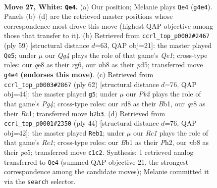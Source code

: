 \documentclass[11pt]{article}
\begin{document}
\clearpage

\begin{figure}[p]\centering
\begin{subfigure}{0.46\textwidth}\centering
\resizebox{\linewidth}{!}{%
\newchessgame
\chessboard[
  setfen={rn1rq1k1/pp3ppp/8/2P1P1B1/6Q1/P5P1/1P3P2/1BR1R1K1 w - - 3 27},
  showmover=false,
  pgfstyle=straightmove, color=movearrow, markmove={g4-e4}
]}
\caption{}
\end{subfigure}\hfill
\begin{subfigure}{0.46\textwidth}\centering
\resizebox{\linewidth}{!}{%
\newchessgame
\chessboard[
  setfen={4qrk1/r5p1/p2p1bR1/3P2Np/1p5P/3Q4/PPP5/1KR5 b - - 4 30},
  showmover=false,
  pgfstyle=straightmove, color=movearrow, markmove={e8-e5}
]}
\caption{}
\end{subfigure}
\\[4pt]
\begin{subfigure}{0.46\textwidth}\centering
\resizebox{\linewidth}{!}{%
\newchessgame
\chessboard[
  setfen={r3r1k1/5pp1/2nB3p/1q1p3P/b1pP2P1/4PP2/7Q/1BR1R1K1 w - - 0 32},
  showmover=false,
  pgfstyle=straightmove, color=movearrow, markmove={g4-g5}
]}
\caption{}
\end{subfigure}\hfill
\begin{subfigure}{0.46\textwidth}\centering
\resizebox{\linewidth}{!}{%
\newchessgame
\chessboard[
  setfen={r2r2k1/3n1pp1/3q3p/PB2p3/1P1p4/5P2/4QP1P/R3R1K1 w - - 1 23},
  showmover=false,
  pgfstyle=straightmove, color=movearrow, markmove={e1-b1}
]}
\caption{}
\end{subfigure}
\caption{\textbf{Move 27, White: \texttt{Qe4}.} (a) Our position; Melanie plays \texttt{Qe4} (\texttt{g4e4}). Panels (b)--(d) are the retrieved master positions whose correspondence most drove this move (highest QAP objective among those that transfer to it). (b) Retrieved from \texttt{ccrl\_top\_p0002\#2467} (ply 59) [structural distance $d$=63, QAP obj=21]: the master played \texttt{Qe5}; under $\mu$ our \emph{Qg4} plays the role of that game's \emph{Qe1}; cross-type roles: our \emph{q}e8 as their \emph{r}g6, our \emph{n}b8 as their \emph{p}d5; transferred move \texttt{g4e4} \textbf{(endorses this move)}. (c) Retrieved from \texttt{ccrl\_top\_p0003\#2867} (ply 62) [structural distance $d$=76, QAP obj=44]: the master played \texttt{g5}; under $\mu$ our \emph{Pb2} plays the role of that game's \emph{Pg4}; cross-type roles: our \emph{r}d8 as their \emph{B}b1, our \emph{q}e8 as their \emph{R}c1; transferred move \texttt{b2b3}. (d) Retrieved from \texttt{ccrl\_top\_p0001\#2350} (ply 44) [structural distance $d$=76, QAP obj=42]: the master played \texttt{Reb1}; under $\mu$ our \emph{Rc1} plays the role of that game's \emph{Re1}; cross-type roles: our \emph{B}b1 as their \emph{P}h2, our \emph{n}b8 as their \emph{p}e5; transferred move \texttt{c1c2}. Synthesis: 1 retrieved analog transferred to \texttt{Qe4} (summed QAP objective 21, the strongest correspondence among the candidate moves); Melanie committed it via the \texttt{search} selector.}
\label{fig:thought-m52}
\end{figure}
\end{document}
